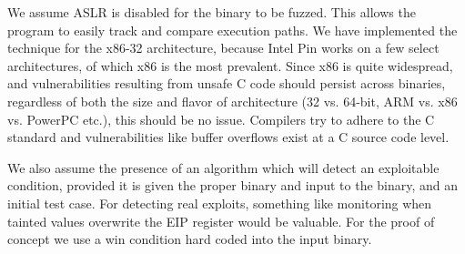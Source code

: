 \documentclass[11pt,expanded,copyright]{fsuthesis}
\begin{document}

We assume ASLR is disabled for the binary to be fuzzed. This allows the program to easily track and compare execution paths. We have implemented the technique for the x86-32 architecture, because Intel Pin works on a few select architectures, of which x86 is the most prevalent. Since x86 is quite widespread, and vulnerabilities resulting from unsafe C code should persist across binaries, regardless of both the size and flavor of architecture (32 vs. 64-bit, ARM vs. x86 vs. PowerPC etc.), this should be no issue. Compilers try to adhere to the C standard and vulnerabilities like buffer overflows exist at a C source code level. 

We also assume the presence of an algorithm which will detect an exploitable condition, provided it is given the proper binary and input to the binary, and an initial test case. For detecting real exploits, something like monitoring when tainted values overwrite the EIP register would be valuable. For the proof of concept we use a win condition hard coded into the input binary.
\end{document}
